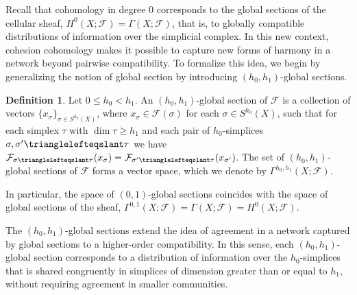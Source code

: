 \documentclass[reqno,12pt]{amsart}
\newcommand{\face}{{\trianglelefteqslant}}
\newcommand{\cF}{{\mathcal F}}
\newcommand{\0}{\mathbf 0}
\theoremstyle{definition}
\newtheorem{definition}[theorem]{Definition}
\begin{document}
Recall that cohomology in degree $0$ corresponds to the global sections of the cellular sheaf, $H^0(X;\cF)=\Gamma(X;\cF)$, that is, to globally compatible distributions of information over the simplicial complex. In this new context, cohesion cohomology makes it possible to capture new forms of harmony in a network beyond pairwise compatibility. To formalize this idea, we begin by generalizing the notion of global section by introducing $(h_0,h_1)$-global sections.

\begin{definition}
    Let $0\leq h_0<h_1$. An $(h_0,h_1)$-global section of $\cF$ is a collection of vectors $\{x_\sigma\}_{\sigma\in S^{h_0}(X)}$, where $x_\sigma\in \cF(\sigma)$ for each $\sigma\in S^{h_0}(X)$, such that for each simplex $\tau$ with $\dim\tau\geq h_1$ and each pair of $h_0$-simplices $\sigma,\sigma'\face \tau$ we have $\cF_{\sigma\face\tau}(x_{\sigma})=\cF_{\sigma'\face\tau}(x_{\sigma'})$. The set of $(h_0,h_1)$-global sections of $\cF$ forms a vector space, which we denote by $\Gamma^{h_0,h_1}(X;\cF)$.
\end{definition}

In particular, the space of $(0,1)$-global sections coincides with the space of global sections of the sheaf, $\Gamma^{0,1}(X;\cF)=\Gamma(X;\cF)=H^0(X;\cF)$.

The $(h_0,h_1)$-global sections extend the idea of agreement in a network captured by global sections to a higher-order compatibility. In this sense, each $(h_0,h_1)$-global section corresponds to a distribution of information over the $h_0$-simplices that is shared congruently in simplices of dimension greater than or equal to $h_1$, without requiring agreement in smaller communities.
\end{document}
